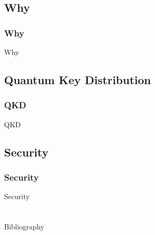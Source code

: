 \documentclass{beamer}
\begin{document}
  \subsection{Why}
  \begin{frame}
    \frametitle{Why}
    Why
  \end{frame}
  \subsection{Quantum Key Distribution}
  \begin{frame}
    \frametitle{QKD}
    QKD
  \end{frame}
  \subsection{Security}
  \begin{frame}
    \frametitle{Security}
    Security
  \end{frame}
  
  \section*{}
  \begin{frame}{Bibliography}
    \nocite{*}
    
    
  \end{frame}
\end{document}
